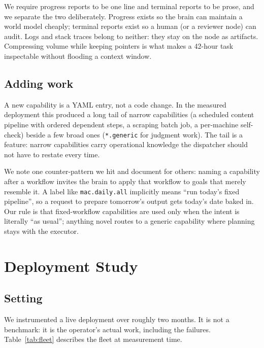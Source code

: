 \documentclass{article}
\begin{document}
We require progress reports to be one line and terminal reports to be prose, and we
separate the two deliberately. Progress exists so the brain can maintain a world
model cheaply; terminal reports exist so a human (or a reviewer node) can audit. Logs
and stack traces belong to neither: they stay on the node as artifacts. Compressing
volume while keeping pointers is what makes a 42-hour task inspectable without
flooding a context window.

\subsection{Adding work}

A new capability is a YAML entry, not a code change. In the measured deployment this
produced a long tail of narrow capabilities (a scheduled content pipeline with ordered
dependent steps, a scraping batch job, a per-machine self-check) beside a few broad
ones (\texttt{*.generic} for judgment work). The tail is a feature: narrow
capabilities carry operational knowledge the dispatcher should not have to restate
every time.

We note one counter-pattern we hit and document for others: naming a capability after
a workflow invites the brain to apply that workflow to goals that merely resemble it.
A label like \texttt{mac.daily.all} implicitly means ``run today's fixed pipeline'',
so a request to prepare tomorrow's output gets today's date baked in. Our rule is that
fixed-workflow capabilities are used only when the intent is literally ``as usual'';
anything novel routes to a generic capability where planning stays with the executor.

\section{Deployment Study}
\label{sec:eval}

\subsection{Setting}

We instrumented a live deployment over roughly two months. It is not a benchmark: it
is the operator's actual work, including the failures. Table~\ref{tab:fleet}
describes the fleet at measurement time.
\end{document}
